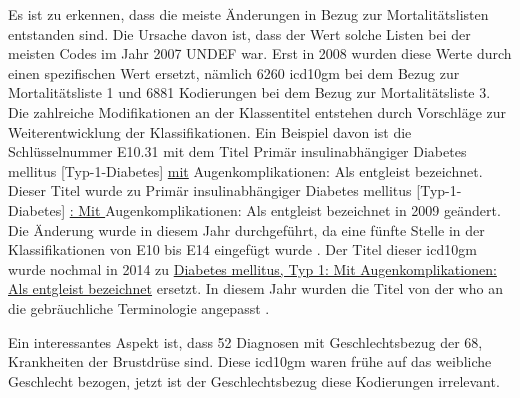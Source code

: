 Es ist zu erkennen, dass die meiste Änderungen in Bezug zur Mortalitätslisten entstanden sind. Die Ursache davon ist, dass der Wert solche Listen bei der meisten Codes im Jahr 2007 \textsf{UNDEF} war. Erst in 2008 wurden diese Werte durch einen spezifischen Wert ersetzt, nämlich \textsf{6260} \ac{icd10gm} bei dem Bezug zur Mortalitätsliste 1 und \textsf{6881} Kodierungen bei dem Bezug zur Mortalitätsliste 3. Die zahlreiche Modifikationen an der Klassentitel entstehen durch Vorschläge zur Weiterentwicklung der Klassifikationen. Ein Beispiel davon ist die Schlüsselnummer \textsf{E10.31} mit dem Titel \textsf{Primär insulinabhängiger Diabetes mellitus [Typ-1-Diabetes] \underline{mit} Augenkomplikationen: Als entgleist bezeichnet}. Dieser Titel wurde zu \textsf{Primär insulinabhängiger Diabetes mellitus [Typ-1-Diabetes] \underline{: Mit } Augenkomplikationen: Als entgleist bezeichnet} in 2009 geändert. Die Änderung wurde in diesem Jahr durchgeführt, da eine fünfte Stelle in der Klassifikationen von \textsf{E10}  bis \textsf{E14} eingefügt wurde \cite{diab09}. Der Titel dieser \ac{icd10gm} wurde nochmal in 2014 zu \textsf{\underline{Diabetes mellitus, Typ 1: Mit Augenkomplikationen: Als entgleist bezeichnet}} ersetzt. In diesem Jahr wurden die Titel von der \ac{who} an die gebräuchliche Terminologie angepasst \cite{diab14}.

Ein interessantes Aspekt ist, dass \textsf{52} Diagnosen mit Geschlechtsbezug der \textsf{68}, Krankheiten der Brustdrüse sind. Diese \ac{icd10gm} waren frühe auf das weibliche Geschlecht bezogen, jetzt ist der Geschlechtsbezug diese Kodierungen irrelevant.

